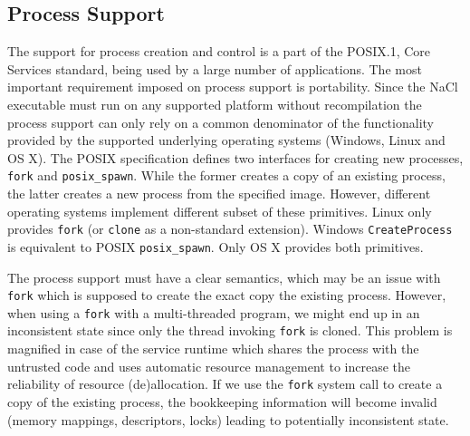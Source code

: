 
\subsection{Process Support}
\label{sub:process_support}

The support for process creation and control is a part of the POSIX.1,
Core Services standard, being used by a large number of applications.
The most important requirement imposed on process support is
portability. Since the NaCl executable must run on any supported
platform without recompilation  the process support can only rely on a
common denominator of the functionality provided by the supported
underlying operating systems (\ie Windows, Linux and OS X). The POSIX
specification defines two interfaces for creating new processes,
\lstinline`fork` and \lstinline`posix_spawn`. While the former creates a
copy of an existing process, the latter creates a new process from the
specified image.  However, different operating systems implement
different subset of these primitives. Linux only provides
\lstinline`fork` (or \lstinline`clone` as a non-standard extension).
Windows \lstinline`CreateProcess` is equivalent to POSIX
\lstinline`posix_spawn`. Only OS X provides both primitives.

The process support must have a clear semantics, which may be an issue
with \lstinline`fork` which is supposed to create the exact copy the
existing process. However, when using a \lstinline`fork` with a
multi-threaded program, we might end up in an inconsistent state since
only the thread invoking \lstinline`fork` is cloned.  This problem is
magnified in case of the service runtime which shares the process with
the untrusted code and uses automatic resource management to increase
the reliability of resource (de)allocation. If we use the
\lstinline`fork` system call to create a copy of the existing process,
the bookkeeping information will become invalid (\eg memory mappings,
descriptors, locks) leading to potentially inconsistent state.

